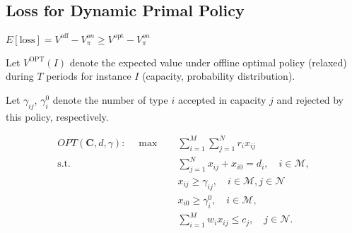 





\subsection{Loss for Dynamic Primal Policy}

$E[\text{loss}] = V^{\text{off}} - V_{\pi}^{on} \geq V^{\text{opt}} - V_{\pi}^{on}$

Let $V^{\text{OPT}}(I)$ denote the expected value under offline optimal policy (relaxed) during $T$ periods for instance $I$ (capacity, probability distribution).


Let $\gamma_{ij}$, $\gamma_{i}^{0}$ denote the number of type $i$ accepted in capacity $j$ and rejected by this policy, respectively.


\begin{align*}
    OPT(\bm{C}, d, \gamma): \quad \max \quad & \sum_{i = 1}^{M} \sum_{j = 1}^{N} r_{i} x_{ij} \\
    \text {s.t.} \quad & \sum_{j=1}^{N} x_{ij} + x_{i0} = d_{i}, \quad i \in \mathcal{M},  \\ 
    & x_{ij} \geq \gamma_{ij}, \quad i \in \mathcal{M}, j \in \mathcal{N} \\
    & x_{i0} \geq \gamma_{i}^{0}, \quad i \in \mathcal{M}, \\
    & \sum_{i=1}^{M} w_{i} x_{ij} \leq c_{j}, \quad j \in \mathcal{N}.
\end{align*}




